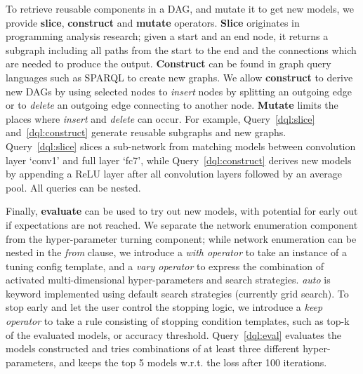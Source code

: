 \documentclass[conference]{IEEEtran}
\begin{document}
To retrieve reusable components in a DAG, and mutate it to get new models, we provide \textbf{slice},
   \textbf{construct} and \textbf{mutate} operators. \textbf{Slice} originates in programming analysis
   research; given a start and an end node, it
    returns a subgraph including all paths from the start to the end and the connections which
    are needed to produce the output. \textbf{Construct} can be found in graph query
    languages such as SPARQL to create new graphs. We allow \textbf{construct} to
    derive new DAGs by using selected nodes to \emph{insert} nodes by splitting an outgoing edge or
    to \emph{delete} an outgoing edge connecting to another node. \textbf{Mutate} limits
    the places where \emph{insert} and \emph{delete} can occur. For example, Query~\ref{dql:slice}
    and~\ref{dql:construct} generate reusable
    subgraphs and new graphs. Query~\ref{dql:slice} slices a sub-network from matching models
    between convolution layer `conv1' and full layer `fc7', while Query~\ref{dql:construct} derives
    new models by appending a ReLU layer after all convolution layers followed by an average pool. All queries can be nested.




Finally, {\bf evaluate} can be used to try out new models, with potential for early out if
expectations are not reached. 
We separate the network enumeration component from the hyper-parameter turning component; 
while network enumeration can be nested in the \emph{from} clause, we introduce a \emph{with operator}
to take an instance of a tuning config template, and a \emph{vary operator} to express the
combination of activated multi-dimensional hyper-parameters and search strategies. \emph{auto} is
keyword implemented using default search strategies (currently grid search). To stop early and let
the user control the stopping logic, we introduce a \emph{keep operator} to take a rule consisting of 
stopping condition templates, such as top-k of the evaluated models, or accuracy threshold.
Query~\ref{dql:eval} evaluates the models constructed and tries combinations of at least three
different hyper-parameters, and keeps the top 5 models w.r.t. the loss after 100 iterations. 
\end{document}
